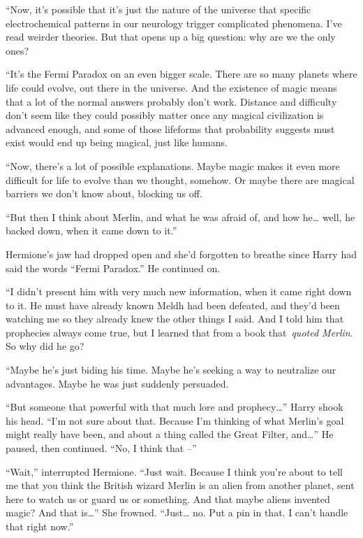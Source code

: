 ``Now, it's possible that it's just the nature of the universe that
specific electrochemical patterns in our neurology trigger complicated
phenomena. I've read weirder theories. But that opens up a big question:
why are we the only ones?

``It's the Fermi Paradox on an even bigger scale. There are so many
planets where life could evolve, out there in the universe. And the
existence of magic means that a lot of the normal answers probably don't
work. Distance and difficulty don't seem like they could possibly matter
once any magical civilization is advanced enough, and some of those
lifeforms that probability suggests must exist would end up being
magical, just like humans.

``Now, there's a lot of possible explanations. Maybe magic makes it even
more difficult for life to evolve than we thought, somehow. Or maybe
there are magical barriers we don't know about, blocking us off.

``But then I think about Merlin, and what he was afraid of, and how
he\ldots{} well, he backed down, when it came down to it.''

Hermione's jaw had dropped open and she'd forgotten to breathe since
Harry had said the words ``Fermi Paradox.'' He continued on.

``I didn't present him with very much new information, when it came
right down to it. He must have already known Meldh had been defeated,
and they'd been watching me so they already knew the other things I
said. And I told him that prophecies always come true, but I learned
that from a book that~\emph{quoted Merlin}. So why did he go?

``Maybe he's just biding his time. Maybe he's seeking a way to
neutralize our advantages. Maybe he was just suddenly persuaded.

``But someone that powerful with that much lore and prophecy\ldots{}''
Harry shook his head. ``I'm not sure about that. Because I'm thinking of
what Merlin's goal might really have been, and about a thing called the
Great Filter, and\ldots{}'' He paused, then continued. ``No, I think
that --''

``Wait,'' interrupted Hermione. ``Just wait. Because I think you're
about to tell me that you think the British wizard Merlin is an alien
from another planet, sent here to watch us or guard us or something. And
that maybe aliens invented magic? And that is\ldots{}'' She frowned.
``Just\ldots{} no. Put a pin in that. I can't handle that right now.''

